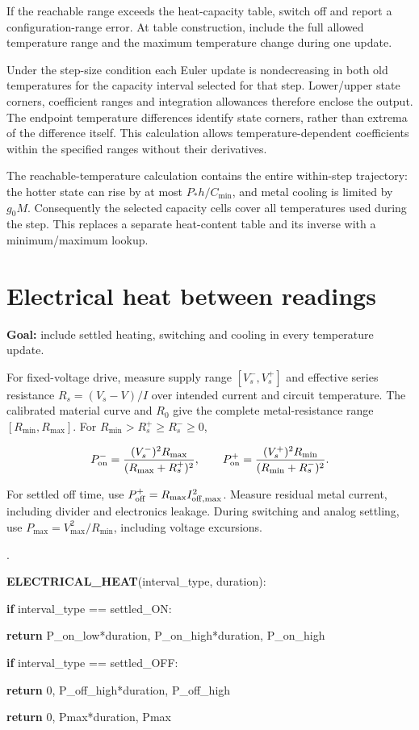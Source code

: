 \documentclass[11pt,letterpaper]{article}
\newcounter{pseudoline}
\newenvironment{pseudocode}{%
  \par\begingroup\small
  \setcounter{pseudoline}{0}
  \begin{list}{\arabic{pseudoline}.}{%
    \usecounter{pseudoline}
    \setlength{\leftmargin}{2.5em}
    \setlength{\labelwidth}{1.9em}
    \setlength{\labelsep}{0.6em}
    \setlength{\itemsep}{0.15em}
    \setlength{\parsep}{0pt}
    \setlength{\topsep}{0.35em}}%
  }{\end{list}\endgroup\par}
\newcommand{\pcstep}[2]{%
  \item \hspace*{#1em}%
  \parbox[t]{\dimexpr\linewidth-#1em\relax}{\raggedright #2\strut}}
\begin{document}
If the reachable range exceeds the heat-capacity table, switch off and report a configuration-range error. At table construction, include the full allowed temperature range and the maximum temperature change during one update.

Under the step-size condition each Euler update is nondecreasing in both old temperatures for the capacity interval selected for that step. Lower/upper state corners, coefficient ranges and integration allowances therefore enclose the output. The endpoint temperature differences identify state corners, rather than extrema of the difference itself. This calculation allows temperature-dependent coefficients within the specified ranges without their derivatives.

The reachable-temperature calculation contains the entire within-step trajectory: the hotter state can rise by at most \(P_*h/C_{\min}\), and metal cooling is limited by \(g_0M\). Consequently the selected capacity cells cover all temperatures used during the step. This replaces a separate heat-content table and its inverse with a minimum/maximum lookup.

\section{Electrical heat between readings}

\textbf{Goal:} include settled heating, switching and cooling in every temperature update.

For fixed-voltage drive, measure supply range \([V_s^-,V_s^+]\) and effective series resistance \(R_s=(V_s-V)/I\) over intended current and circuit temperature. The calibrated material curve and \(R_0\) give the complete metal-resistance range \([R_{\min},R_{\max}]\). For \(R_{\min}>R_s^+\ge R_s^-\ge0\),

\[
P_{\rm on}^- = \frac{(V_s^-)^2R_{\max}}{(R_{\max}+R_s^+)^2},\qquad
P_{\rm on}^+ = \frac{(V_s^+)^2R_{\min}}{(R_{\min}+R_s^-)^2}.
\]

For settled off time, use \(P_{\rm off}^+=R_{\max}I_{\rm off,max}^2\). Measure residual metal current, including divider and electronics leakage. During switching and analog settling, use \(P_{\max}=V_{\max}^2/R_{\min}\), including voltage excursions.

\begin{pseudocode}
\pcstep{0.0}{\textbf{ELECTRICAL\_\allowbreak{}HEAT}(interval\_\allowbreak{}type, duration):}
\pcstep{1.0}{\textbf{if} interval\_\allowbreak{}type == settled\_\allowbreak{}ON:}
\pcstep{2.0}{\textbf{return} P\_\allowbreak{}on\_\allowbreak{}low*duration, P\_\allowbreak{}on\_\allowbreak{}high*duration, P\_\allowbreak{}on\_\allowbreak{}high}
\pcstep{1.0}{\textbf{if} interval\_\allowbreak{}type == settled\_\allowbreak{}OFF:}
\pcstep{2.0}{\textbf{return} 0, P\_\allowbreak{}off\_\allowbreak{}high*duration, P\_\allowbreak{}off\_\allowbreak{}high}
\pcstep{1.0}{\textbf{return} 0, Pmax*duration, Pmax}
\end{pseudocode}
\end{document}
